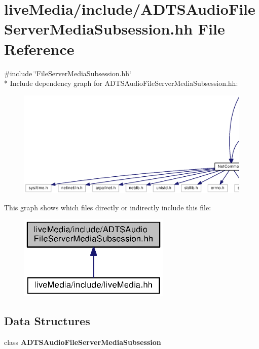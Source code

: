 \section{live\+Media/include/\+A\+D\+T\+S\+Audio\+File\+Server\+Media\+Subsession.hh File Reference}
\label{ADTSAudioFileServerMediaSubsession_8hh}
{\ttfamily \#include \char`\"{}File\+Server\+Media\+Subsession.\+hh\char`\"{}}\\*
Include dependency graph for A\+D\+T\+S\+Audio\+File\+Server\+Media\+Subsession.\+hh\+:
\nopagebreak
\begin{figure}[H]
\begin{center}
\leavevmode
\includegraphics[width=350pt]{ADTSAudioFileServerMediaSubsession_8hh__incl}
\end{center}
\end{figure}
This graph shows which files directly or indirectly include this file\+:
\nopagebreak
\begin{figure}[H]
\begin{center}
\leavevmode
\includegraphics[width=205pt]{ADTSAudioFileServerMediaSubsession_8hh__dep__incl}
\end{center}
\end{figure}
\subsection*{Data Structures}
\begin{DoxyCompactItemize}
\item 
class {\bf A\+D\+T\+S\+Audio\+File\+Server\+Media\+Subsession}
\end{DoxyCompactItemize}
